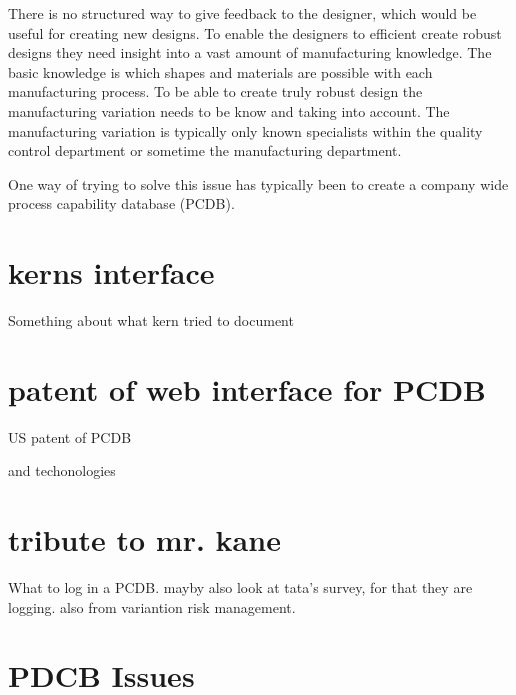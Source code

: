 \documentclass[aip,amsmath,reprint, author-year]{revtex4-1}
\begin{document}
 

 
There is no structured way to give feedback to the designer, which would be useful for creating new designs. 
To enable the designers to efficient create robust designs they need insight into a vast amount of manufacturing knowledge. 
The basic knowledge is which shapes and materials are possible with each manufacturing process. 
To be able to create truly robust design the manufacturing variation needs to be know and taking into account. The manufacturing variation is typically only known specialists within the quality control department or sometime the manufacturing department. 



One way of trying to solve this issue has typically been to create a company wide process capability database (PCDB). 

\section{kerns interface}

Something about what kern tried to document

\section{patent of web interface for PCDB}

US patent of PCDB 

and techonologies

\section{tribute to mr. kane}

What to log in a PCDB.
mayby also look at tata's survey, for that they are logging.
also from variantion risk management.

\section{PDCB Issues}
\end{document}
